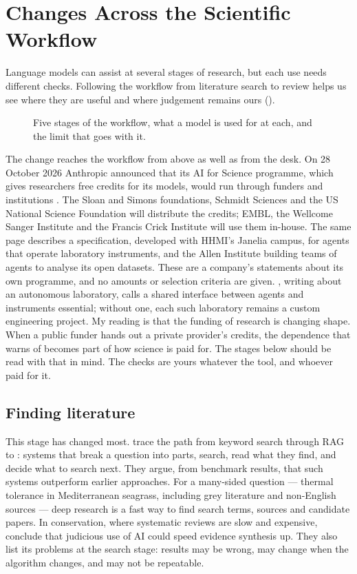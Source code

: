 \chapter{Changes Across the Scientific Workflow}
\label{ch:scientificworkflow}

Language models can assist at several stages of research, but each use needs
different checks. Following the workflow from literature search to review
helps us see where they are useful and where judgement remains ours
().

\begin{figure}[htbp]
\centering
{}
\caption{Five stages of the workflow, what a model is used for at each, and
the limit that goes with it.}
\label{fig:workflow}
\end{figure}

The change reaches the workflow from above as well as from the desk. On
28 October 2026 Anthropic announced that its AI for Science programme, which
gives researchers free credits for its models, would run through funders and
institutions \parencite{anthropic2026aiforscience}. The Sloan and Simons
foundations, Schmidt Sciences and the US National Science Foundation will
distribute the credits; EMBL, the Wellcome Sanger Institute and the Francis
Crick Institute will use them in-house. The same page describes a
specification, developed with HHMI's Janelia campus, for agents that operate
laboratory instruments, and the Allen Institute building teams of agents to
analyse its open datasets. These are a company's statements about its own
programme, and no amounts or selection criteria are given.
\textcite{zou2026wetlab}, writing about an autonomous laboratory, calls a
shared interface between agents and instruments essential; without one, each
such laboratory remains a custom engineering project. My reading is
that the funding of research is changing shape. When a public funder hands
out a private provider's credits, the dependence that 
warns of becomes part of how science is paid for. The stages below should
be read with that in mind. The checks are yours whatever the tool, and
whoever paid for it.

\section{Finding literature}

This stage has changed most. \textcite{zhang2025deepresearch} trace the path from
keyword search through RAG to : systems that break a question
into parts, search, read what they find, and decide what to search next. They
argue, from benchmark results, that such systems outperform earlier approaches.
For a many-sided question --- thermal tolerance in Mediterranean seagrass,
including grey literature and non-English sources --- deep research is a fast
way to find search terms, sources and candidate papers. In conservation, where
systematic reviews are slow and expensive, \textcite{bergertal2024evidence}
conclude that judicious use of AI could speed evidence synthesis up. They also
list its problems at the search stage: results may be wrong, may change when the
algorithm changes, and may not be repeatable.

